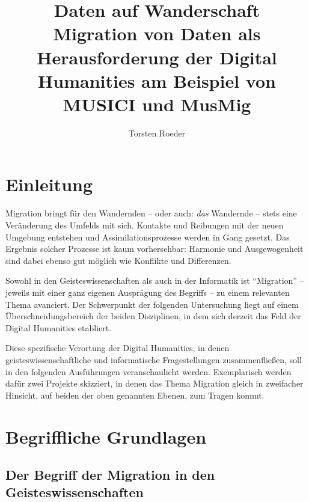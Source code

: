 \documentclass[a4paper,
fontsize=11pt,
oneside,
numbers=noperiodatend,
parskip=half-,
bibliography=totoc,
final
]{scrartcl}
\title{\LARGE{Daten auf Wanderschaft} \\ \LARGE{Migration von Daten als Herausforderung der Digital Humanities am Beispiel von MUSICI und MusMig}} %
\author{Torsten Roeder} %
\date{}
\begin{document}
\maketitle
\thispagestyle{fancyplain} 


\section*{Einleitung}\label{einleitung}

Migration bringt für den Wandernden -- oder auch: \emph{das} Wandernde
-- stets eine Veränderung des Umfelds mit sich. Kontakte und Reibungen
mit der neuen Umgebung entstehen und Assimilationsprozesse werden in
Gang gesetzt. Das Ergebnis solcher Prozesse ist kaum vorhersehbar:
Harmonie und Ausgewogenheit sind dabei ebenso gut möglich wie Konflikte
und Differenzen.

Sowohl in den Geisteswissenschaften als auch in der Informatik ist
\enquote{Migration} -- jeweils mit einer ganz eigenen Ausprägung des
Begriffs -- zu einem relevanten Thema avanciert. Der Schwerpunkt der
folgenden Untersuchung liegt auf einem Überschneidungsbereich der beiden
Disziplinen, in dem sich derzeit das Feld der Digital Humanities
etabliert.

Diese spezifische Verortung der Digital Humanities, in denen
geisteswissenschaftliche und informatische Fragestellungen
zusammenfließen, soll in den folgenden Ausführungen veranschaulicht
werden. Exemplarisch werden dafür zwei Projekte skizziert, in denen das
Thema Migration gleich in zweifacher Hinsicht, auf beiden der oben
genannten Ebenen, zum Tragen kommt.

\section*{Begriffliche Grundlagen}\label{begriffliche-grundlagen}

\subsection*{Der Begriff der Migration in den
Geisteswissenschaften}\label{der-begriff-der-migration-in-den-geisteswissenschaften}
\end{document}
